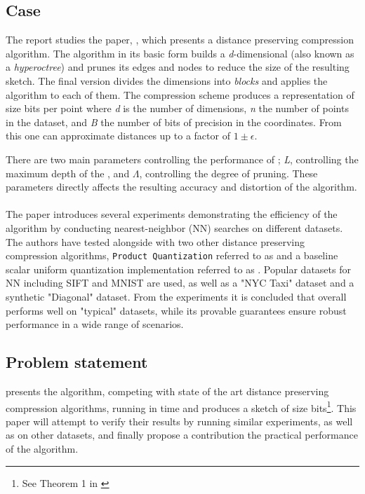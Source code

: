 \subsection{Case} %
The report studies the paper, \cite{wagner17}, which presents a distance preserving compression algorithm. The algorithm in its basic form builds a \textit{d}-dimensional \qt{}(also known as a \textit{hyperoctree}) and prunes its edges and nodes to reduce the size of the resulting sketch. The final version divides the dimensions into \textit{blocks} and applies the algorithm to each of them. The compression scheme produces a representation of size  bits per point where \textit{d} is the number of dimensions, \textit{n} the number of points in the dataset, and \textit{B} the number of bits of precision in the coordinates. From this one can approximate distances up to a factor of $1\pm\epsilon$. 

There are two main parameters controlling the performance of \qs{}; \textit{L}, controlling the maximum depth of the \qt{}, and $\Lambda$, controlling the degree of pruning. These parameters directly affects the resulting accuracy and distortion of the algorithm.
\\
\\
The paper introduces several experiments demonstrating the efficiency of the algorithm by conducting nearest-neighbor (NN) searches on different datasets. The authors have tested \qs{} alongside with two other distance preserving compression algorithms, \texttt{Product Quantization} referred to as \pq{} and a baseline scalar uniform quantization implementation referred to as \gr{}. Popular datasets for NN including SIFT and MNIST are used, as well as a "NYC Taxi" dataset and a synthetic "Diagonal" dataset. From the experiments it is concluded that \qs{} overall performs well on "typical" datasets, while its provable guarantees ensure robust performance in a wide range of scenarios\cite[p. 2, l. 38-40]{wagner17}. 

\subsection{Problem statement} %
\label{intro:problemStatement}
\cite{wagner17} presents the \qs{} algorithm, competing with state of the art distance preserving compression algorithms, running in  time and produces a sketch of size  bits\footnote{See Theorem 1 in \cite[p. 3]{wagner17}}. This paper will attempt to verify their results by running similar experiments, as well as on other datasets, and finally propose a contribution the practical performance of the \qs{} algorithm.



